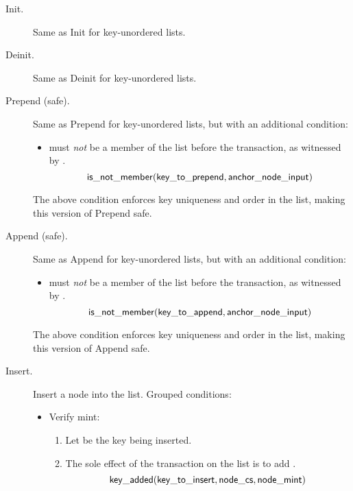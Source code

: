 \documentclass[../midgard.tex]{subfiles}
\begin{document}
\begin{description}
    \item[Init.] Same as Init for key-unordered lists.
        \initSpendingValidatorWarning
    \item[Deinit.] Same as Deinit for key-unordered lists.
    \item[Prepend (safe).] Same as Prepend for key-unordered lists, but with an additional condition:
        \begin{itemize}
            \item {} must \emph{not} be a member of the list before the transaction, as witnessed by .
                \begin{equation*}
                    \mathsf{is\_not\_member} (\mathsf{key\_to\_prepend}, \mathsf{anchor\_node\_input})
                \end{equation*}
        \end{itemize}

    The above condition enforces key uniqueness and order in the list, making this version of Prepend safe.
    
    \item[Append (safe).] Same as Append for key-unordered lists, but with an additional condition:
        \begin{itemize}
            \item {} must \emph{not} be a member of the list before the transaction, as witnessed by .
                \begin{equation*}
                    \mathsf{is\_not\_member} (\mathsf{key\_to\_append}, \mathsf{anchor\_node\_input})
                \end{equation*}
        \end{itemize}

    The above condition enforces key uniqueness and order in the list, making this version of Append safe.
    
    \item[Insert.] Insert a node into the list.
      Grouped conditions:
        \begin{itemize}
            \item Verify mint:
            \begin{enumerate}
                \item Let  be the key being inserted.
                \item The sole effect of the transaction on the list is to add .
                    \begin{equation*}
                        \mathsf{key\_added}(\mathsf{key\_to\_insert}, \mathsf{node\_cs}, \mathsf{node\_mint})
                    \end{equation*}
            \end{enumerate}
            

\end{itemize}
\end{description}
\end{document}
